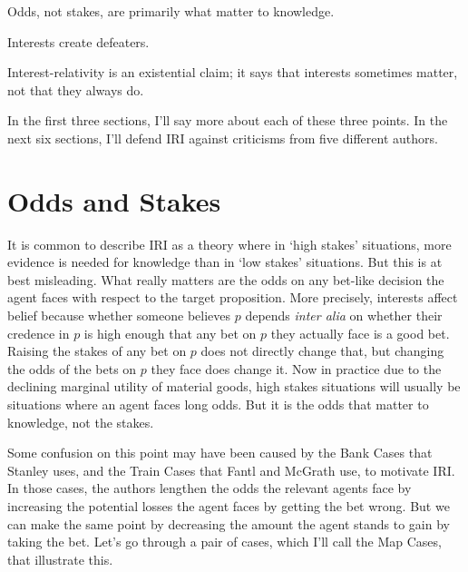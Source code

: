 \documentclass[oneside]{book}
\begin{document}
\begin{itemize*}
\item Odds, not stakes, are primarily what matter to knowledge.
\item Interests create defeaters.
\item Interest-relativity is an existential claim; it says that interests sometimes matter, not that they always do.
\end{itemize*}

\noindent In the first three sections, I'll say more about each of these three points. In the next six sections, I'll defend IRI against criticisms from five different authors.

\section{Odds and Stakes}

It is common to describe IRI as a theory where in `high stakes' situations, more evidence is needed for knowledge than in `low stakes' situations. But this is at best misleading. What really matters are the odds on any bet-like decision the agent faces with respect to the target proposition. More precisely, interests affect belief because  whether someone believes \(p\) depends \textit{inter alia} on whether their credence in \(p\) is high enough that any bet on \(p\) they actually face is a good bet. Raising the stakes of any bet on \(p\) does not directly change that, but changing the odds of the bets on \(p\) they face does change it. Now in practice due to the declining marginal utility of material goods, high stakes situations will usually be situations where an agent faces long odds. But it is the odds that matter to knowledge, not the stakes.

Some confusion on this point may have been caused by the Bank Cases that Stanley uses, and the Train Cases that Fantl and McGrath use, to motivate IRI. In those cases, the authors lengthen the odds the relevant agents face by increasing the potential losses the agent faces by getting the bet wrong. But we can make the same point by decreasing the amount the agent stands to gain by taking the bet. Let's go through a pair of cases, which I'll call the Map Cases, that illustrate this.
\end{document}
